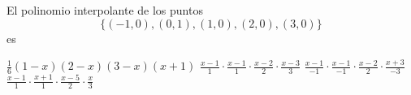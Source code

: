 \begin{pregunta}
\puntaje{}
\begin{cuerpo}
El polinomio interpolante de los puntos
$$
\{(-1,0),(0,1),(1,0),(2,0),(3,0)\}
$$
es
\end{cuerpo}
\begin{multicols}{2}
\begin{alternativas}
{$\frac{1}{6} (1-x)(2-x)(3-x)(x+1)$}
{$\frac{x-1}{1}\cdot \frac{x-1}{1} \cdot \frac{x-2}{2} \cdot \frac{x-3}{3}$}
{$\frac{x-1}{-1}\cdot \frac{x-1}{-1} \cdot \frac{x-2} {2} \cdot \frac{x+3}{-3}$}
{$\frac{x-1}{1}\cdot \frac{x+1}{1}  \cdot\frac{x-5}{2}  \cdot \frac{x}{3}$}
\end{alternativas}
\end{multicols}
\justificacion{5cm}
\end{pregunta}